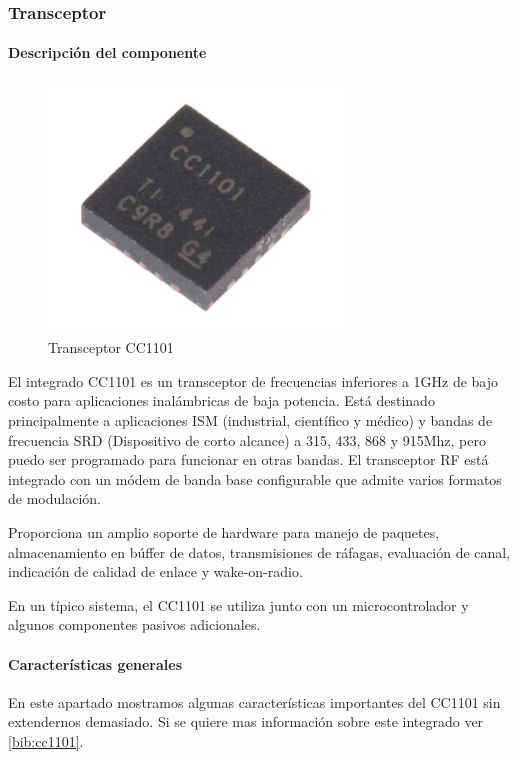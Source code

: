\subsubsection{Transceptor}
\paragraph{Descripción del componente} \par


\begin{figure}[htb]
	\centering
	\includegraphics[scale=0.6]{images/CC1101.png}
    \caption{Transceptor CC1101}
	\label{fig:cc1101}
\end{figure}

El integrado CC1101 es un transceptor de frecuencias inferiores a 1GHz de bajo costo para aplicaciones inalámbricas de baja potencia. Está destinado principalmente
a aplicaciones ISM (industrial, científico y médico) y bandas de frecuencia SRD (Dispositivo de corto alcance) a 315, 433, 868 y 915Mhz, pero puedo ser programado 
para funcionar en otras bandas. El transceptor RF está integrado con un módem de banda base configurable que admite varios formatos de modulación.\par 
Proporciona un amplio soporte de hardware para manejo de paquetes, almacenamiento en búffer de datos, transmisiones de ráfagas, evaluación de canal,
indicación de calidad de enlace y wake-on-radio. \par 
En un típico sistema, el CC1101 se utiliza junto con un microcontrolador y algunos componentes pasivos adicionales.

\paragraph{Características generales} \par

En este apartado mostramos algunas características importantes del CC1101 sin extendernos demasiado. Si se quiere mas información sobre este integrado ver \ref{bib:cc1101}.

